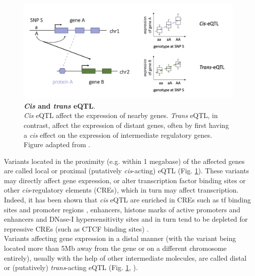 \begin{figure}[h]
\centering
\includegraphics[width=14.5cm]{Chapter1/Fig/eqtl.png}
\caption[\textit{Cis} and \textit{trans} eQTL]{\textbf{\textit{Cis} and \textit{trans} eQTL}.\\
\textit{Cis} eQTL affect the expression of nearby genes. 
\textit{Trans} eQTL, in contrast, affect the expression of distant genes, often by first having a \textit{cis} effect on the expression of intermediate regulatory genes.
Figure adapted from \cite{westra2014genome}.
}
\label{fig:eqtl}
\end{figure}

Variants located in the proximity  (e.g. within 1 megabase) of the affected genes are called local or proximal (putatively \textit{cis}-acting) eQTL (Fig. \ref{fig:eqtl}). 
These variants may directly affect gene expression, or alter transcription factor binding sites or other \textit{cis}-regulatory elements (CREs), which in turn may affect transcription. 
Indeed, it has been shown that \textit{cis} eQTL are enriched in CREs \cite{lappalainen2013transcriptome, battle2014characterizing} such as \gls{tf} binding sites and promoter regions \cite{gaffney2012dissecting}, enhancers, histone marks of active promoters and enhancers and DNase-I hypersensitivity sites \cite{degner2012dnase} and in turn tend to be depleted for repressive CREs (such as CTCF binding sites) \cite{reinhart200021, westra2014genome}. \\

Variants affecting gene expression in a distal manner (with the variant being located more than 5Mb away from the gene or on a different chromosome entirely), usually with the help of other intermediate molecules, are called distal or (putatively) \textit{trans}-acting eQTL (Fig. \ref{fig:eqtl}, \cite{westra2014genome}).\\

